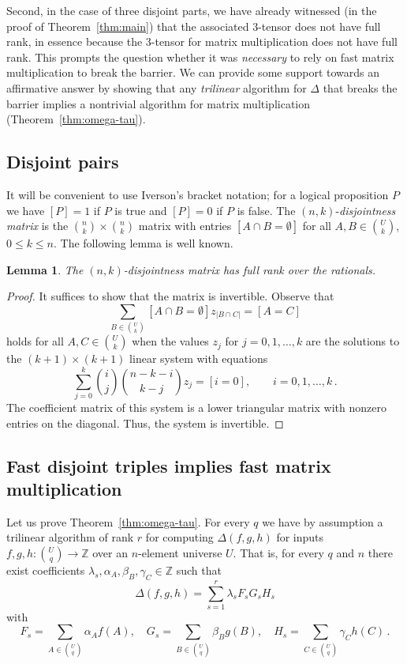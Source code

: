 \documentclass{amsart}
\newtheorem{Lem}{Lemma}
\begin{document}
Second, in the case of three disjoint parts, we have already
witnessed (in the proof of Theorem~\ref{thm:main}) that the
associated 3-tensor does not have full rank, in essence
because the 3-tensor for matrix multiplication does
not have full rank. This prompts the question whether it was
{\em necessary} to rely on fast matrix multiplication 
to break the barrier. We can provide some support towards an 
affirmative answer by showing that any {\em trilinear} algorithm 
for $\Delta$ that breaks the barrier implies a nontrivial algorithm 
for matrix multiplication (Theorem~\ref{thm:omega-tau}).

\subsection{Disjoint pairs}
It will be convenient to use Iverson's bracket notation;
for a logical proposition $P$ we have $[P]=1$ if $P$ is true and $[P]=0$ if
$P$ is false. The $(n,k)$-{\em disjointness matrix} is the 
$\binom{n}{k}\times\binom{n}{k}$ matrix with entries $[A\cap B=\emptyset]$
for all $A,B\in\binom{U}{k}$, $0\leq k\leq n$.
The following lemma is well known.

\begin{Lem}
\label{lem:disjmat}
The $(n,k)$-disjointness matrix has full rank over the rationals.
\end{Lem}

\begin{proof}
It suffices to show that the matrix is invertible. Observe that
\[
\sum_{B\in\binom{U}{k}} [A\cap B=\emptyset] z_{|B\cap C|} = [A=C]
\]
holds for all $A,C\in\binom{U}{k}$ when the values $z_j$ 
for $j=0,1,\ldots,k$ are the solutions to the $(k+1)\times(k+1)$ 
linear system with equations
\[
\sum_{j=0}^k \binom{i}{j}\binom{n-k-i}{k-j} z_j = [i=0],\qquad i=0,1,\ldots,k\,.
\]
The coefficient matrix of this system is a lower triangular matrix
with nonzero entries on the diagonal. Thus, the system is invertible.
\end{proof}
 

\subsection{Fast disjoint triples implies fast matrix multiplication}

Let us prove Theorem~\ref{thm:omega-tau}.
For every $q$ 
we have by assumption a trilinear algorithm of rank $r$ for 
computing $\Delta(f,g,h)$ for inputs 
$f,g,h:\binom{U}{q}\rightarrow\mathbb{Z}$
over an $n$-element universe $U$.
That is, for every $q$ and $n$ there exist coefficients 
$\lambda_s,\alpha_A,\beta_B,\gamma_C\in\mathbb{Z}$ 
such that
\[
\Delta(f,g,h)=\sum_{s=1}^r \lambda_sF_sG_sH_s
\]
with
\[
F_s=\sum_{A\in\binom{U}{q}}\alpha_Af(A),\quad
G_s=\sum_{B\in\binom{U}{q}}\beta_Bg(B),\quad
H_s=\sum_{C\in\binom{U}{q}}\gamma_Ch(C)\,.
\]
\end{document}
